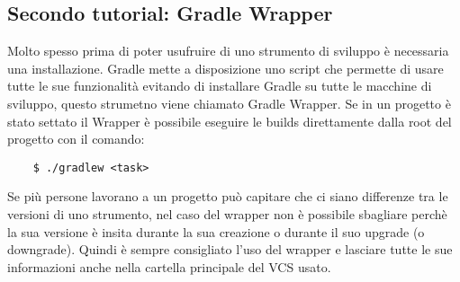 \subsection{Secondo tutorial: Gradle Wrapper}
Molto spesso prima di poter usufruire di uno strumento di sviluppo è necessaria una installazione. Gradle mette a disposizione uno script che permette di usare tutte le sue funzionalità evitando di installare Gradle su tutte le macchine di sviluppo, questo strumetno viene chiamato Gradle Wrapper. Se in un progetto è stato settato il Wrapper è possibile eseguire le builds direttamente dalla root del progetto con il comando:
\begin{verbatim}
    $ ./gradlew <task> \end{verbatim}
Se più persone lavorano a un progetto può capitare che ci siano differenze tra le versioni di uno strumento, nel caso del wrapper non è possibile sbagliare perchè la sua versione è insita durante la sua creazione o durante il suo upgrade (o downgrade). Quindi è sempre consigliato l'uso del wrapper e lasciare tutte le sue informazioni anche nella cartella principale del VCS usato.

